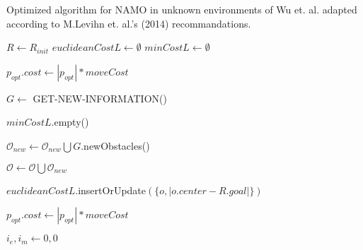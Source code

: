 \begin{algorithm}[H]

  \caption{Optimized algorithm for NAMO in unknown environments of Wu et. al. adapted according to M.Levihn et. al.'s (2014) recommandations.}

  \label{alg:namoue_augmented}

  \begin{algorithmic}[1]


        \State $R \gets R_{init}$
        \State $euclideanCostL \gets \emptyset$
        \State $minCostL \gets \emptyset$
        \State {} 

        \State $p_{opt}.cost \gets |p_{opt}| * moveCost$


        \State $G \gets $ GET-NEW-INFORMATION()

          \State $minCostL$.empty()
        \EndIf

        \State $\mathcal{O}_{new} \gets \mathcal{O}_{new} \bigcup G.$newObstacles()


            \State $\mathcal{O} \gets \mathcal{O} \bigcup \mathcal{O}_{new}$

              \State $euclideanCostL$.insertOrUpdate$(\{o, |o.center - R.goal|\})$
            \EndFor

            \State {}
            \State $p_{opt}.cost \gets |p_{opt}| * moveCost$

            \State $i_{e}, i_{m} \gets 0 , 0$


\end{algorithmic}
\end{algorithm}
